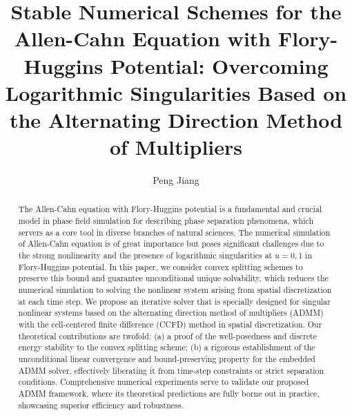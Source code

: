 \documentclass{mcom-l}
\theoremstyle{definition}
\theoremstyle{remark}
\numberwithin{equation}{section}
\begin{document}
\title[An Iterative Solver for Allen-Cahn equation with Flory-Huggins potential with ADMM framework]
{Stable Numerical Schemes for the Allen-Cahn Equation with Flory-Huggins Potential: Overcoming Logarithmic Singularities Based on the Alternating Direction Method of Multipliers}



\author{Peng Jiang}
\address{School of Mathematical Sciences,
Peking University, Beijing, China}
\curraddr{}






\dedicatory{}

\date{}




\begin{abstract}
The Allen-Cahn equation with Flory-Huggins potential is a fundamental and crucial model in phase field simulation for describing phase separation phenomena, 
which servers as a core tool in diverse branches of natural sciences. 
The numerical simulation of Allen-Cahn equation is of great importance but poses significant challenges due to the strong nonlinearity and the presence of logarithmic singularities at $u=0,1$ in Flory-Huggins potential. 
In this paper, we consider convex splitting schemes to preserve this bound and guarantee unconditional unique solvability, 
which reduces the numerical simulation to solving the nonlinear system arising from spatial discretization at each time step. 
We propose an iterative solver that is specially designed for singular nonlinear systems based on the alternating direction method of multipliers (ADMM) with the cell-centered finite difference (CCFD) method in spatial discretization. 
Our theoretical contributions are twofold: (a) a proof of the well-posedness and discrete energy stability to the convex splitting scheme; 
(b) a rigorous establishment of the unconditional linear convergence and bound-preserving property for the embedded ADMM solver, 
effectively liberating it from time-step constraints or strict separation conditions. 
Comprehensive numerical experiments serve to validate our proposed ADMM framework, where its theoretical predictions are fully borne out in practice, 
showcasing superior efficiency and robustness.

\end{abstract}
\end{document}
